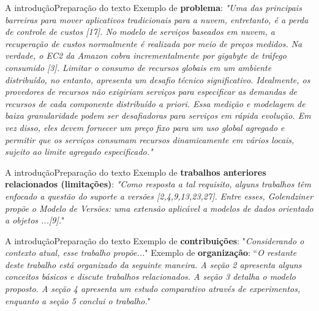 \documentclass[t]{beamer}
\begin{document}

\begin{ftst}{A introdução}{Preparação do texto}
\justifying
Exemplo de \textbf{problema}:
\small
\vone
\textit{"Uma das principais barreiras para mover aplicativos tradicionais para a nuvem, entretanto, é a perda de controle de custos [17]. No modelo de serviços baseados em nuvem, a recuperação de custos normalmente é realizada por meio de preços medidos. Na verdade, o EC2 da Amazon cobra incrementalmente por gigabyte de tráfego consumido [3]. Limitar o consumo de recursos globais em um ambiente distribuído, no entanto, apresenta um desafio técnico significativo. Idealmente, os provedores de recursos não exigiriam serviços para especificar as demandas de recursos de cada componente distribuído a priori. Essa medição e modelagem de baixa granularidade podem ser desafiadoras para serviços em rápida evolução. Em vez disso, eles devem fornecer um preço fixo para um uso global agregado e permitir que os serviços consumam recursos dinamicamente em vários locais, sujeito ao limite agregado especificado."}
\end{ftst}


\begin{ftst}{A introdução}{Preparação do texto}
\justifying
Exemplo de \textbf{trabalhos anteriores relacionados (limitações)}:
\small
\vone
\textit{"Como resposta a tal requisito, alguns trabalhos têm enfocado a questão do suporte a versões [2,4,9,13,23,27]. Entre esses, Golendziner propõe o Modelo de Versões: uma extensão aplicável a modelos de dados orientado a objetos ...[9].}"
\end{ftst}


\begin{ftst}{A introdução}{Preparação do texto}
\justifying
Exemplo de \textbf{contribuições}:
\small
\vone
"\textit{Considerando o contexto atual, esse trabalho propõe...}"
\vone
\vone
Exemplo de \textbf{organização}:
\small
\vone
“\textit{O restante deste trabalho está organizado da seguinte maneira. A seção 2 apresenta alguns conceitos básicos e discute trabalhos relacionados. A seção 3 detalha o modelo proposto. A seção 4 apresenta um estudo comparativo através de experimentos, enquanto a seção 5 conclui o trabalho.}"
\end{ftst}

\end{document}

